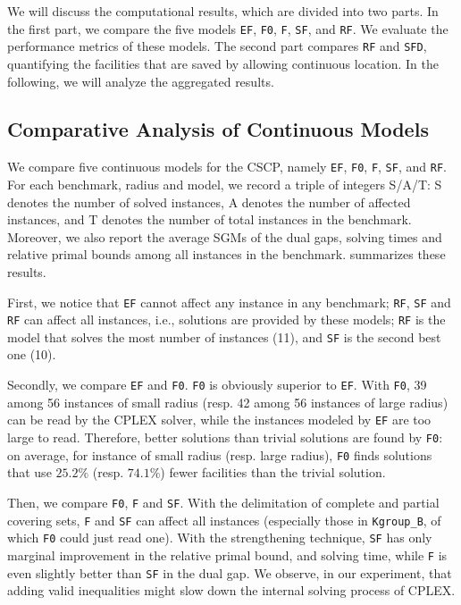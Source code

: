 We will discuss the computational results, which are divided into two parts. In the first part, we compare the five models \texttt{EF}, \texttt{F0}, \texttt{F}, \texttt{SF}, and \texttt{RF}. We evaluate the performance metrics of these models. The second part compares \texttt{RF}  and \texttt{SFD},  quantifying the facilities that are saved by allowing continuous location. In the following, we will analyze the aggregated results. 

\subsection{Comparative Analysis of Continuous Models}



We compare five continuous models for the CSCP, namely  \texttt{EF}, \texttt{F0}, \texttt{F}, \texttt{SF}, and \texttt{RF}. For each  benchmark, radius and model, we record a triple of integers S/A/T: S denotes the number of solved instances, A denotes the number of affected instances, and T denotes the number of total instances in the benchmark. Moreover, we also report the  average SGMs of the dual gaps, solving times and relative primal bounds among all instances in the benchmark.  summarizes these results.
 
 First, we notice that \texttt{EF} cannot affect any instance in any benchmark; \texttt{RF}, \texttt{SF} and \texttt{RF} can affect all instances, i.e., solutions are provided by these models; \texttt{RF} is the model that solves the most number of instances (11), and \texttt{SF} is the second best one (10).
 
 Secondly, we compare \texttt{EF} and \texttt{F0}. \texttt{F0} is obviously superior to \texttt{EF}. With \texttt{F0}, 39 among 56 instances of small radius (resp. 42 among 56 instances of large radius) can be read by the CPLEX solver, while the instances modeled by \texttt{EF} are too large to read. Therefore, better solutions than trivial solutions are found by \texttt{F0}: on average, for instance of small radius (resp. large radius), \texttt{F0} finds solutions that use $25.2\%$ (resp. $74.1\%$) fewer facilities than the trivial solution.

Then, we compare \texttt{F0}, \texttt{F}  and \texttt{SF}. With the delimitation of complete and partial covering sets, \texttt{F} and \texttt{SF} can affect all instances (especially those in \texttt{Kgroup\_B}, of which \texttt{F0} could just read one).
With the strengthening technique, \texttt{SF} has only marginal improvement in the relative primal bound, and solving time, while \texttt{F} is even slightly better than \texttt{SF} in the dual gap. We observe, in our experiment, that adding valid inequalities might slow down the internal solving process of CPLEX.

